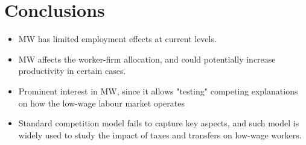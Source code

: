             \section{Conclusions}
            \begin{itemize}
            \item MW has limited employment effects at current levels.
            \item MW affects the worker-firm allocation, and could potentially increase productivity in certain cases.
            \item Prominent interest in MW, since it allows "testing" competing explanations on how the low-wage labour market operates
            \item Standard competition model fails to capture key aspects, and such model is widely used to study the impact of taxes and transfers on low-wage workers.
            \end{itemize}